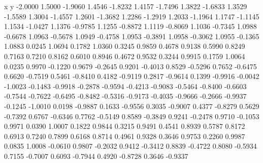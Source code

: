 x y
-2.0000    1.5000
   -1.9060    1.4546
   -1.8232    1.4157
   -1.7496    1.3822
   -1.6833    1.3529
   -1.5589    1.3004
   -1.4557    1.2601
   -1.3682    1.2286
   -1.2919    1.2033
   -1.1964    1.1747
   -1.1145    1.1534
   -1.0427    1.1376
   -0.9785    1.1255
   -0.8872    1.1119
   -0.8069    1.1036
   -0.7345    1.0988
   -0.6678    1.0963
   -0.5678    1.0949
   -0.4758    1.0953
   -0.3891    1.0958
   -0.3062    1.0955
   -0.1365    1.0883
    0.0245    1.0694
    0.1782    1.0360
    0.3245    0.9859
    0.4678    0.9138
    0.5990    0.8249
    0.7163    0.7210
    0.8162    0.6010
    0.8946    0.4672
    0.9532    0.3244
    0.9915    0.1759
    1.0064    0.0235
    0.9970   -0.1220
    0.9679   -0.2645
    0.9201   -0.4013
    0.8529   -0.5296
    0.7652   -0.6475
    0.6620   -0.7519
    0.5461   -0.8410
    0.4182   -0.9119
    0.2817   -0.9614
    0.1399   -0.9916
   -0.0042   -1.0023
   -0.1483   -0.9918
   -0.2878   -0.9594
   -0.4213   -0.9083
   -0.5464   -0.8400
   -0.6603   -0.7544
   -0.7622   -0.6495
   -0.8482   -0.5316
   -0.9173   -0.4035
   -0.9666   -0.2666
   -0.9937   -0.1245
   -1.0010    0.0198
   -0.9887    0.1633
   -0.9556    0.3035
   -0.9007    0.4377
   -0.8279    0.5629
   -0.7392    0.6767
   -0.6346    0.7762
   -0.5149    0.8589
   -0.3849    0.9241
   -0.2478    0.9710
   -0.1053    0.9971
    0.0390    1.0007
    0.1822    0.9844
    0.3215    0.9491
    0.4541    0.8939
    0.5787    0.8172
    0.6913    0.7240
    0.7899    0.6168
    0.8714    0.4961
    0.9328    0.3646
    0.9753    0.2260
    0.9987    0.0835
    1.0008   -0.0610
    0.9807   -0.2032
    0.9412   -0.3412
    0.8839   -0.4722
    0.8080   -0.5934
    0.7155   -0.7007
    0.6093   -0.7944
    0.4920   -0.8728
    0.3646   -0.9337
